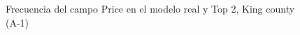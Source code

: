 \begin{figure}[H]
    \centering
    
    \caption{Frecuencia del campo Price en el modelo real y Top 2, King county (A-1)}
    \label{frecuency-top2-price}
\end{figure}